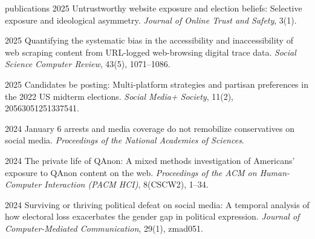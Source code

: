 \begin{publist}{publications}
  {2025}
  {Untrustworthy website exposure and election beliefs: Selective exposure and ideological asymmetry.}
  {\textit{Journal of Online Trust and Safety}, 3(1). }
  {}

  {2025}
  {Quantifying the systematic bias in the accessibility and inaccessibility of web scraping content from URL-logged web-browsing digital trace data.}
  {\textit{Social Science Computer Review}, 43(5), 1071--1086. }
  {}

  {2025}
  {Candidates be posting: Multi-platform strategies and partisan preferences in the 2022 US midterm elections.}
  {\textit{Social Media+ Society}, 11(2), 20563051251337541. }
  {}

  {2024}
  {January 6 arrests and media coverage do not remobilize conservatives on social media.}
  {\textit{Proceedings of the National Academies of Sciences}. }
  {}

  {2024}
  {The private life of QAnon: A mixed methods investigation of Americans' exposure to QAnon content on the web.}
  {\textit{Proceedings of the ACM on Human-Computer Interaction (PACM HCI)}, 8(CSCW2), 1--34. }
  {}

  {2024}
  {Surviving or thriving political defeat on social media: A temporal analysis of how electoral loss exacerbates the gender gap in political expression.}
  {\textit{Journal of Computer-Mediated Communication}, 29(1), zmad051. }
  {}


\end{publist}

